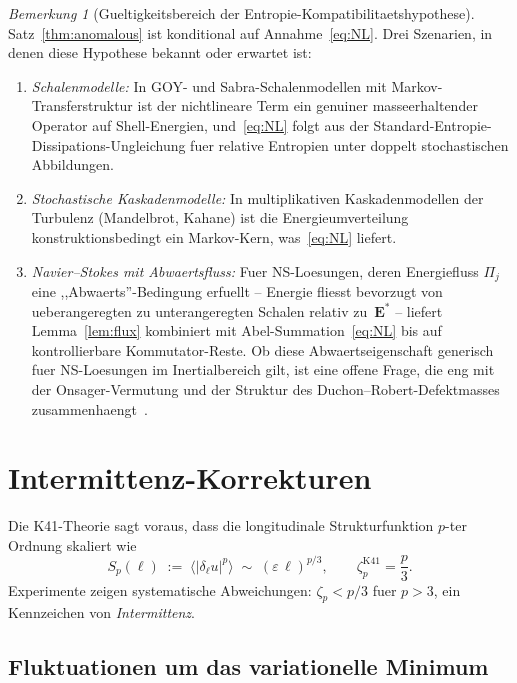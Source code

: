 \documentclass[12pt,a4paper]{article}
\theoremstyle{definition}
\theoremstyle{plain}
\theoremstyle{remark}
\newtheorem{remark}[definition]{Bemerkung}
\begin{document}
\begin{remark}[Gueltigkeitsbereich der Entropie-Kompatibilitaetshypothese]
Satz~\ref{thm:anomalous} ist konditional auf
Annahme~\eqref{eq:NL}. Drei Szenarien, in denen diese Hypothese
bekannt oder erwartet ist:
\begin{enumerate}
\item \emph{Schalenmodelle:} In GOY- und Sabra-Schalenmodellen mit
  Markov-Transferstruktur ist der nichtlineare Term ein genuiner
  masseerhaltender Operator auf Shell-Energien, und~\eqref{eq:NL}
  folgt aus der Standard-Entropie-Dissipations-Ungleichung fuer relative
  Entropien unter doppelt stochastischen Abbildungen.
\item \emph{Stochastische Kaskadenmodelle:} In multiplikativen
  Kaskadenmodellen der Turbulenz (Mandelbrot, Kahane) ist die
  Energieumverteilung konstruktionsbedingt ein Markov-Kern, was~\eqref{eq:NL}
  liefert.
\item \emph{Navier--Stokes mit Abwaertsfluss:} Fuer NS-Loesungen, deren
  Energiefluss $\Pi_j$ eine ,,Abwaerts''-Bedingung erfuellt -- Energie
  fliesst bevorzugt von ueberangeregten zu unterangeregten Schalen relativ
  zu~$\mathbf{E}^*$ -- liefert Lemma~\ref{lem:flux} kombiniert mit
  Abel-Summation~\eqref{eq:NL} bis auf kontrollierbare Kommutator-Reste.
  Ob diese Abwaertseigenschaft generisch fuer NS-Loesungen im
  Inertialbereich gilt, ist eine offene Frage, die eng mit der
  Onsager-Vermutung und der Struktur des Duchon--Robert-Defektmasses
  zusammenhaengt~\cite{DR00}.
\end{enumerate}
\end{remark}

\section{Intermittenz-Korrekturen}\label{sec:intermittency}

Die K41-Theorie sagt voraus, dass die longitudinale Strukturfunktion
$p$-ter Ordnung skaliert wie
\begin{equation}\label{eq:Sp_K41}
  S_p(\ell) \;:=\;
  \bigl\langle |\delta_\ell u|^p \bigr\rangle
  \;\sim\; (\varepsilon\,\ell)^{p/3},
  \qquad
  \zeta_p^{\mathrm{K41}} = \frac{p}{3}.
\end{equation}
Experimente zeigen systematische Abweichungen: $\zeta_p < p/3$ fuer
$p > 3$, ein Kennzeichen von \emph{Intermittenz}.

\subsection{Fluktuationen um das variationelle Minimum}
\end{document}
